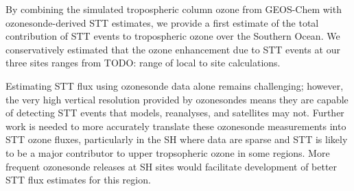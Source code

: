 \documentclass[acp, manuscript]{copernicus} %
\begin{document}
By combining the simulated tropospheric column ozone from GEOS-Chem with ozonesonde-derived STT estimates, we provide a first estimate of the total contribution of STT events to tropospheric ozone over the Southern Ocean.
We conservatively estimated that the ozone enhancement due to STT events at our three sites ranges from TODO: range of local to site calculations.

Estimating STT flux using ozonesonde data alone remains challenging; however, the very high vertical resolution provided by ozonesondes means they are capable of detecting STT events that models, reanalyses, and satellites may not. 
Further work is needed to more accurately translate these ozonesonde measurements into STT ozone fluxes, particularly in the SH where data are sparse and STT is likely to be a major contributor to upper tropsopheric ozone in some regions.
More frequent ozonesonde releases at SH sites would facilitate development of better STT flux estimates for this region.

\appendix

\appendixfigures  %
\appendixtables   %

\end{document}
